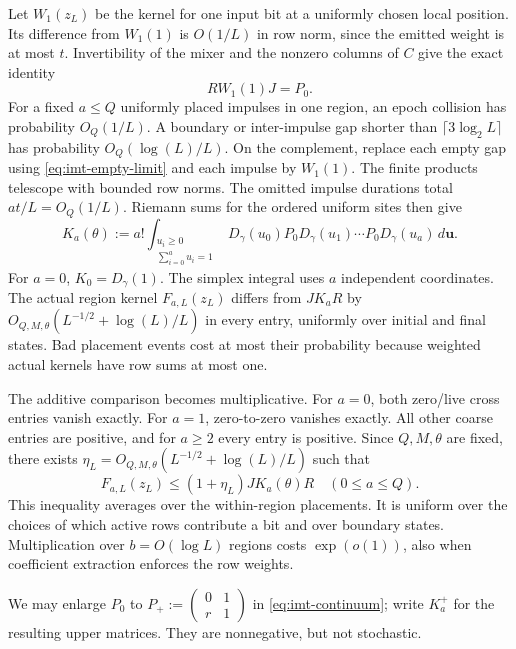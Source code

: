 Let $W_1(z_L)$ be the kernel for one input bit at a uniformly chosen local
position. Its difference from $W_1(1)$ is $O(1/L)$ in row norm, since the
emitted weight is at most $t$. Invertibility of the mixer and the nonzero
columns of $C$ give the exact identity
\[
 RW_1(1)J=P_0.
\]
For a fixed $a\le Q$ uniformly placed impulses in one region, an epoch
collision has probability $O_Q(1/L)$. A boundary or inter-impulse gap shorter
than $\lceil3\log_2L\rceil$ has probability $O_Q(\log(L)/L)$.
On the complement, replace each empty gap using
\eqref{eq:imt-empty-limit} and each impulse by $W_1(1)$. The finite products
telescope with bounded row norms. The omitted impulse durations total
$at/L=O_Q(1/L)$. Riemann sums for the ordered uniform sites then give
\begin{equation}
 K_a(\theta):=a!\int_{\substack{u_i\ge0\\\sum_{i=0}^a u_i=1}}
 D_\gamma(u_0)P_0D_\gamma(u_1)\cdots P_0D_\gamma(u_a)\,d\boldsymbol u.
 \label{eq:imt-continuum}
\end{equation}
For $a=0$, $K_0=D_\gamma(1)$. The simplex integral uses $a$ independent
coordinates. The actual region kernel $F_{a,L}(z_L)$ differs from $JK_aR$
by $O_{Q,M,\theta}(L^{-1/2}+\log(L)/L)$ in every entry, uniformly over
initial and final states. Bad placement events cost at most their probability
because weighted actual kernels have row sums at most one.

The additive comparison becomes multiplicative. For $a=0$, both zero/live
cross entries vanish exactly. For $a=1$, zero-to-zero vanishes exactly.
All other coarse entries are positive, and for $a\ge2$ every entry is
positive. Since $Q,M,\theta$ are fixed, there exists
$\eta_L=O_{Q,M,\theta}(L^{-1/2}+\log(L)/L)$ such that
\begin{equation}
 F_{a,L}(z_L)\le(1+\eta_L)JK_a(\theta)R\quad(0\le a\le Q).
 \label{eq:imt-componentwise-limit}
\end{equation}
This inequality averages over the within-region placements. It is uniform
over the choices of which active rows contribute a bit and over boundary
states. Multiplication over $b=O(\log L)$ regions costs $\exp(o(1))$,
also when coefficient extraction enforces the row weights.

We may enlarge $P_0$ to
$P_+:=\left(\begin{smallmatrix}0&1\\r&1\end{smallmatrix}\right)$
in \eqref{eq:imt-continuum}; write $K_a^+$ for the resulting upper matrices.
They are nonnegative, but not stochastic.

